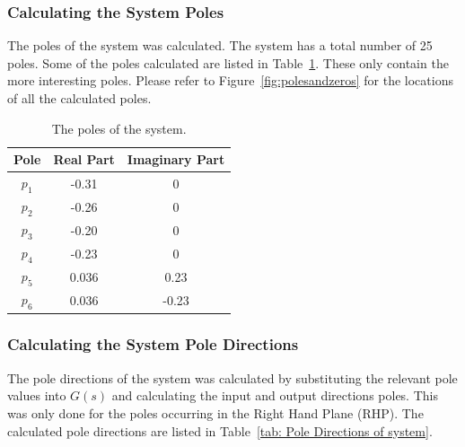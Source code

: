 \subsubsection{Calculating the System Poles}

The poles of the system was calculated. The system has a total  number of 25 poles. Some of the poles calculated are listed in Table~\ref{tab: Poles of system}. These only contain the more interesting poles. Please refer to Figure~\ref{fig:polesandzeros} for the locations of all the calculated poles.

\begin{table}[H]
	\centering
	\caption{The poles of the system.}
	\begin{tabular}{ccc}
		\hline
		\textbf{Pole} & \textbf{Real Part} & \textbf{Imaginary Part} \\\hline
		$p_1$            & -0.31            & 0                       \\
		$p_2$            & -0.26            & 0                       \\
		$p_3$            & -0.20            & 0                 \\
		$p_4$            & -0.23            & 0                 \\
		$p_5$            & 0.036             & 0.23                  \\
		$p_6$            & 0.036             & -0.23   \\\hline             
	\end{tabular}
	\label{tab: Poles of system}
\end{table}

\subsubsection{Calculating the System Pole Directions}

The pole directions of the system was calculated by substituting the relevant pole values into $G(s)$ and calculating the input and output directions poles. This was only done for the poles occurring in the Right Hand Plane (RHP). The calculated pole directions are listed in Table~\ref{tab: Pole Directions of system}.

